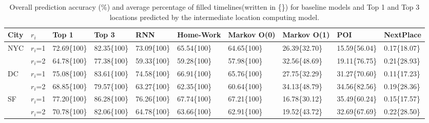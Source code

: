 \begin{table*}[t]
\centering
\caption{Overall prediction accuracy (\%) and average percentage of filled timelines(written in \{\}) for baseline models and Top 1 and Top 3 locations predicted by the intermediate location computing model.}
\begin{tabular}{llllllllll}
\toprule
City           & $r_i$   & Top 1 & Top 3 & RNN &  Home-Work & Markov O(0) & Markov O(1) & POI   & NextPlace \\
\midrule
NYC  & $r_i$=1 & 72.69\{100\} & 82.35\{100\} &  73.09\{100\} &   65.54\{100\}     & 64.65\{100\}       & 26.39\{32.70\}       & 15.59\{56.04\} & 0.17\{18.07\}      \\
               & $r_i$=2 & 64.78\{100\} & 77.38\{100\} & 59.33\{100\} & 59.28\{100\}     & 57.98\{100\}       & 32.56\{48.69\}       & 19.11\{76.75\} & 0.21\{28.93\}      \\
DC & $r_i$=1 & 75.08\{100\} & 83.61\{100\} & 74.58\{100\} & 66.91\{100\}     & 65.76\{100\}       & 27.75\{32.29\}       & 31.27\{70.60\} & 0.11\{17.23\}      \\
               & $r_i$=2 & 68.85\{100\} & 79.57\{100\} &63.27\{100\}& 62.35\{100\}     & 60.64\{100\}       & 34.13\{48.79\}       & 34.56\{82.56\} & 0.19\{28.36\}      \\
SF  & $r_i$=1 & 77.20\{100\} & 86.28\{100\} &76.26\{100\}& 67.74\{100\}     & 67.21\{100\}       & 16.78\{30.12\}       & 35.49\{60.24\} & 0.15\{17.57\}      \\
               & $r_i$=2 & 70.78\{100\} & 82.06\{100\} &64.78\{100\}& 63.66\{100\}     & 62.91\{100\}       & 19.52\{43.72\}       & 32.69\{67.69\} & 0.22\{28.50\}\\ 
\bottomrule               
\end{tabular}

\end{table*}


